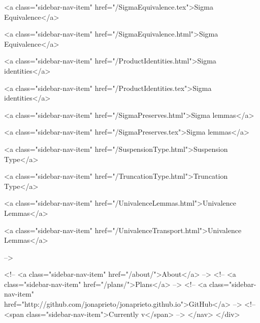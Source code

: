       
    
      
        
          <a class="sidebar-nav-item" href="/SigmaEquivalence.tex">Sigma Equivalence</a>
        
      
    
      
        
          <a class="sidebar-nav-item" href="/SigmaEquivalence.html">Sigma Equivalence</a>
        
      
    
      
        
          <a class="sidebar-nav-item" href="/ProductIdentities.html">Sigma identities</a>
        
      
    
      
        
          <a class="sidebar-nav-item" href="/ProductIdentities.tex">Sigma identities</a>
        
      
    
      
        
          <a class="sidebar-nav-item" href="/SigmaPreserves.html">Sigma lemmas</a>
        
      
    
      
        
          <a class="sidebar-nav-item" href="/SigmaPreserves.tex">Sigma lemmas</a>
        
      
    
      
        
          <a class="sidebar-nav-item" href="/SuspensionType.html">Suspension Type</a>
        
      
    
      
        
          <a class="sidebar-nav-item" href="/TruncationType.html">Truncation Type</a>
        
      
    
      
        
          <a class="sidebar-nav-item" href="/UnivalenceLemmas.html">Univalence Lemmas</a>
        
      
    
      
        
          <a class="sidebar-nav-item" href="/UnivalenceTransport.html">Univalence Lemmas</a>
        
      
     -->

    <!-- <a class="sidebar-nav-item" href="/about/">About</a> -->
    <!-- <a class="sidebar-nav-item" href="/plans/">Plans</a> -->
    <!-- <a class="sidebar-nav-item" href="http://github.com/jonaprieto/jonaprieto.github.io">GitHub</a> -->
    <!-- <span class="sidebar-nav-item">Currently v</span> -->
  </nav>
</div>

